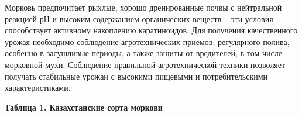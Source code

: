 Морковь предпочитает рыхлые, хорошо дренированные почвы с нейтральной
реакцией рН и высоким содержанием органических веществ -- эти условия
способствует активному накоплению каратиноидов. Для получения
качественного урожая необходимо соблюдение агротехнических приемов:
регулярного полива, особенно в засушливые периоды, а также защиты от
вредителей, в том числе морковной мухи. Соблюдение правильной
агротехнической техники позволяет получать стабильные урожаи с высокими
пищевыми и потребительскими характеристиками.

{\bfseries Таблица 1. Казахстанские сорта моркови}

